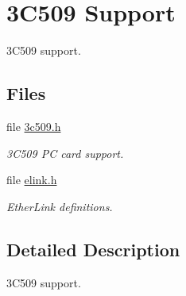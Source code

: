\hypertarget{group__pc386__3c509}{}\section{3C509 Support}
\label{group__pc386__3c509}


3C509 support.  


\subsection*{Files}
\begin{DoxyCompactItemize}
\item 
file \mbox{\hyperlink{3c509_8h}{3c509.\+h}}
\begin{DoxyCompactList}\small\item\em 3C509 PC card support. \end{DoxyCompactList}\item 
file \mbox{\hyperlink{elink_8h}{elink.\+h}}
\begin{DoxyCompactList}\small\item\em Ether\+Link definitions. \end{DoxyCompactList}\end{DoxyCompactItemize}


\subsection{Detailed Description}
3C509 support. 

